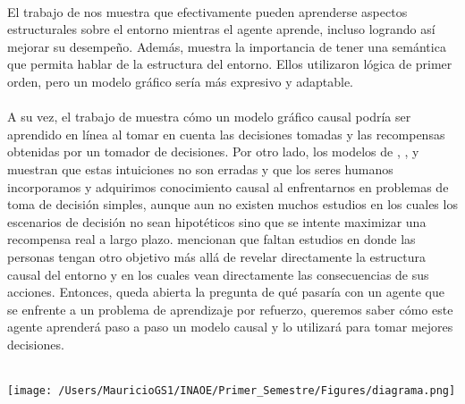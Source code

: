 \documentclass[11pt]{article}
\theoremstyle{plain}
\begin{document}
\\
El trabajo de \cite{garnelo2016towards} nos muestra que efectivamente pueden aprenderse aspectos estructurales sobre el entorno mientras el agente aprende, incluso logrando así mejorar su desempeño. Además, muestra la importancia de tener una semántica que permita hablar de la estructura del entorno. Ellos utilizaron lógica de primer orden, pero un modelo gráfico sería más expresivo y adaptable.\\
\\
A su vez, el trabajo de \cite{wellen2012learning} muestra cómo un modelo gráfico causal podría ser aprendido en línea al tomar en cuenta las decisiones tomadas y las recompensas obtenidas por un tomador de decisiones. Por otro lado, los modelos de \cite{sloman2006causal}, \cite{meder2008inferring}, \cite{hagmayer2009decision} y \cite{hagmayer2013repeated} muestran que estas intuiciones no son erradas y que los seres humanos incorporamos y adquirimos conocimiento causal al enfrentarnos en problemas de toma de decisión simples, aunque aun no existen muchos estudios en los cuales los escenarios de decisión no sean hipotéticos sino que se intente maximizar una recompensa real a largo plazo. \cite{hagmayer2013repeated} mencionan que faltan estudios en donde las personas tengan otro objetivo más allá de revelar directamente la estructura causal del entorno y en los cuales vean directamente las consecuencias de sus acciones. Entonces, queda abierta la pregunta de qué pasaría con un agente que se enfrente a un problema de aprendizaje por refuerzo, queremos saber cómo este agente aprenderá paso a paso un modelo causal y lo utilizará para tomar mejores decisiones.\\
\\
\begin{center}
\texttt{[image: /Users/MauricioGS1/INAOE/Primer\_Semestre/Figures/diagrama.png]}
\end{center}
\newpage


\end{document}
